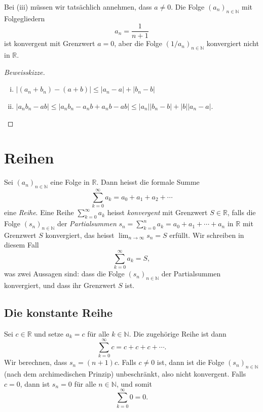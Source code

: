 \documentclass[../main.tex]{subfiles}
\begin{document}
\begin{remark}
Bei (iii) müssen wir tatsächlich annehmen,
dass $a \neq 0$. Die Folge ${(a_n)}_{n \in \mathbb{N}}$ 
mit Folgegliedern
\[
  a_n = \frac{1}{n+1}
\]
ist konvergent mit Grenzwert $a = 0$, aber die Folge
${(1/a_n)}_{n \in \mathbb{N}}$ konvergiert nicht in $\mathbb{R}$.
\end{remark}

\begin{proof}[Beweisskizze]
  \leavevmode
  \begin{enumerate}[(i)]
    \item $|(a_n + b_n) - (a + b)| \leq |a_n - a| + |b_n - b|$
    \item $|a_n b_n - ab| \leq 
      {|a_n b_n - a_n b + a_n b - ab |}
      \leq |a_n| |b_n - b| + |b||a_n -a|$. \qedhere
  \end{enumerate}
\end{proof}


\section{Reihen}
\begin{definition}
  Sei ${(a_{n})}_{n \in \mathbb{N}}$ eine Folge in $\mathbb{R}$.
  Dann heisst die formale Summe
  \[
    \sum_{k=0}^{\infty} a_k = a_0 + a_1 + a_2 + \cdots
  \]
  eine \emph{Reihe}. Eine Reihe
  $
    \sum_{k=0}^{\infty} a_k
  $
  heisst \emph{konvergent} mit Grenzwert $S \in \mathbb{R}$,
  falls die Folge ${(s_{n})}_{n \in \mathbb{N}}$ der
  \emph{Partialsummen}
  \(
    s_n = \sum_{k=0}^{n} a_k = a_0 + a_1 + \cdots + a_n
  \)
  in $\mathbb{R}$ mit Grenzwert $S$ konvergiert, das heisst
  \(
    \lim_{n \to \infty} s_n = S
  \)
  erfüllt. Wir schreiben in diesem Fall
  \[
    \sum_{k=0}^{\infty} a_k = S,
  \]
  was zwei Aussagen sind: dass die Folge ${(s_{n})}_{n \in \mathbb{N}}$ der Partialsummen konvergiert, und dass
  ihr Grenzwert $S$ ist.
\end{definition}

\subsection*{Die konstante Reihe}
Sei $c \in \mathbb{R}$ und setze $a_k = c$ für alle 
$k \in \mathbb{N}$.
Die zugehörige Reihe ist dann
 \[
  \sum_{k=0}^{\infty} c = c + c + c + \cdots.
\]
Wir berechnen, dass $s_n = (n+1)c$.
Falls $c \neq 0$ ist, dann ist die Folge
${(s_{n})}_{n \in \mathbb{N}}$ (nach dem
archimedischen Prinzip) unbeschränkt,
also nicht konvergent. Falls $c = 0$,
dann ist $s_n = 0$ für alle $n \in \mathbb{N}$,
und somit
\[
  \sum_{k=0}^{\infty} 0 = 0.
\]
\end{document}
